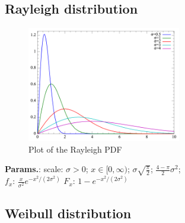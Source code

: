     
        
\subsection{Rayleigh distribution}


    \begin{figure}[H]
        \centering
        \includegraphics[width=0.6\textwidth]{images/Rayleigh distributionPDF.png}
        \caption{Plot of the Rayleigh PDF}
    \end{figure}




    {\color{darkblue} \textbf{Params.}:} {scale: $\sigma>0$}; {$x\in [0,\infty)$}; {$\sigma \sqrt{\frac{\pi}{2}}$}; {$\frac{4 - \pi}{2} \sigma^2$};\hspace{0.5cm}\\{\color{darkblue} \textbf{$f_x$}:} {$\frac{x}{\sigma^2} e^{-x^2/\left(2\sigma^2\right)}$}{\color{darkblue} \textbf{$F_x$}:} {$1 - e^{-x^2/\left(2\sigma^2\right)}$}



    
        
\subsection{Weibull distribution}


